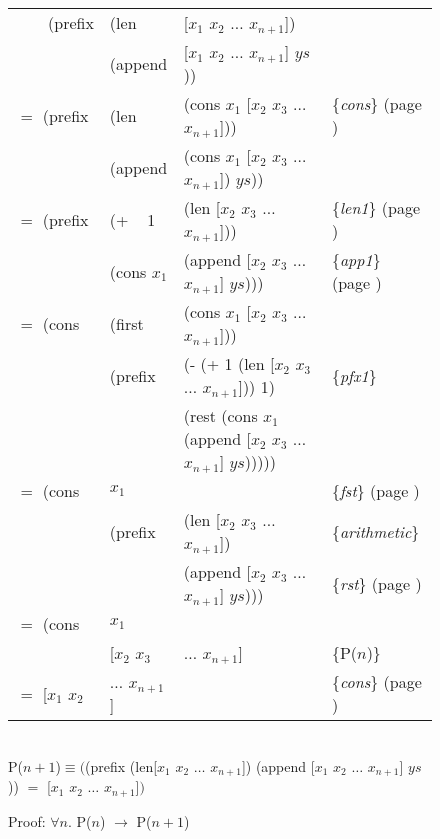 \begin{figure}
\begin{center}
\begin{spacing}{0.9}
\addtolength{\tabcolsep}{-5pt}
\begin{tabular}{llll}
~~~~\textsf{(prefix} &\textsf{(len}    &\textsf{[$x_1$ $x_2$ $\dots$ $x_{n+1}$])}    &\\
            &\textsf{(append} &\textsf{[$x_1$ $x_2$ $\dots$ $x_{n+1}$] $ys$))}       &\\
$=$ \textsf{(prefix} &\textsf{(len}    &\textsf{(cons $x_1$ [$x_2$ $x_3$ $\dots$ $x_{n+1}$]))}&\{\emph{cons}\} (page \pageref{first-rest-cons})\\
            &\textsf{(append} &\textsf{(cons $x_1$ [$x_2$ $x_3$ $\dots$ $x_{n+1}$]) $ys$))}&\\
$=$	\textsf{(prefix} &\textsf{(+ ~ 1}  &\textsf{(len [$x_2$ $x_3$ $\dots$ $x_{n+1}$]))}       &\{\emph{len1}\} (page \pageref{len-equations})\\
            &\textsf{(cons $x_1$}  &\textsf{(append [$x_2$ $x_3$ $\dots$ $x_{n+1}$] $ys$)))}&\{\emph{app1}\} (page \pageref{append-equations})\\
$=$ \textsf{(cons}   &\textsf{(first}  &\textsf{(cons $x_1$ [$x_2$ $x_3$ $\dots$ $x_{n+1}$]))}&\\
            &\textsf{(prefix} &\textsf{(- (+ 1 (len [$x_2$ $x_3$ $\dots$ $x_{n+1}$])) 1)}&\{\emph{pfx1}\}\\
            &        &\textsf{(rest (cons $x_1$ (append [$x_2$ $x_3$ $\dots$ $x_{n+1}$] $ys$)))))}&\\
$=$ \textsf{(cons}   &$x_1$   &                                           &\{\emph{fst}\} (page \pageref{first-rest-cons})\\
            &\textsf{(prefix} &\textsf{(len [$x_2$ $x_3$ $\dots$ $x_{n+1}$])}        &\{\emph{arithmetic}\}\\
            &        &\textsf{(append [$x_2$ $x_3$ $\dots$ $x_{n+1}$] $ys$)))}& \{\emph{rst}\} (page \pageref{first-rest-cons})\\
$=$ \textsf{(cons}   &$x_1$   &                                          &\\
            &\textsf{[$x_2$ $x_3$} &$\dots$ $x_{n+1}$]                   &\{P($n$)\} \\
$=$ \textsf{[$x_1$ $x_2$} & \textsf{$\dots$ $x_{n+1}$]}                  &&\{\emph{cons}\} (page \pageref{first-rest-cons}) \\
\end{tabular}
\addtolength{\tabcolsep}{5pt}
\end{spacing}
~~\vspace{1mm}\\
P($n+1$)$\equiv($\textsf{(prefix (len[$x_1$ $x_2$ $\dots$ $x_{n+1}$]) (append [$x_1$ $x_2$ $\dots$ $x_{n+1}$] $ys$))} $=$
 \textsf{[$x_1$ $x_2$ $\dots$ $x_{n+1}$]}$)$
\end{center}
\caption{Proof: $\forall n.$ P($n$) $\rightarrow$ P($n+1$)}
\label{pfx-induc}
\end{figure}

